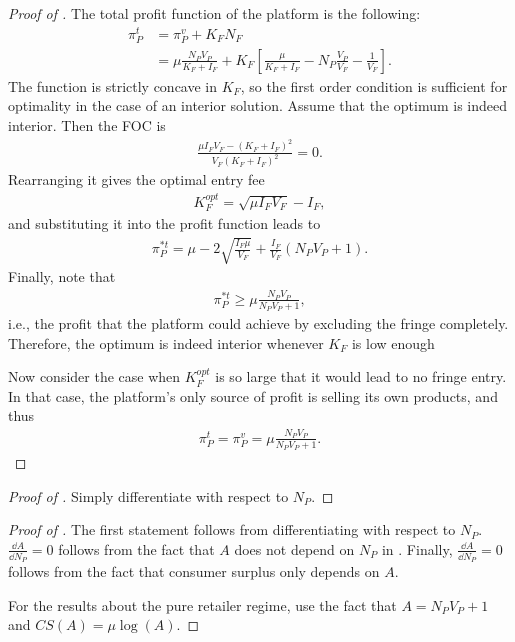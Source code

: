 \begin{proof}[Proof of ]
    The total profit function of the platform is the following:
    \begin{align}
        \pi_P^t &= \pi_P^v + K_F N_F \nonumber \\
        &= \mu \frac{N_P V_P}{K_F + I_F} + K_F \left[ \frac{\mu}{K_F + I_F} - N_P \frac{V_P}{V_F} - \frac{1}{V_F} \right]. \label{eq:platform_profits}
    \end{align}
    The function is strictly concave in $K_F$, so the first order condition is sufficient for optimality in the case of an interior solution.
    Assume that the optimum is indeed interior.
    Then the FOC is
    \begin{align*}
        \frac{\mu I_F V_F - (K_F + I_F)^2}{V_F (K_F + I_F)^2} = 0.
    \end{align*}
    Rearranging it gives the optimal entry fee
    \begin{align*}
        K_F^{opt} = \sqrt{\mu I_F V_F} - I_F,
    \end{align*}
    and substituting it into the profit function leads to
    \begin{align*}
        \pi_P^{*t} = \mu - 2\sqrt{\frac{I_F \mu}{V_F}} + \frac{I_F}{V_F} (N_P V_P + 1).
    \end{align*}
    Finally, note that
    \begin{align*}
        \pi_P^{*t} \geq \mu \frac{N_P V_P}{N_P V_P + 1},
    \end{align*}
    i.e., the profit that the platform could achieve by excluding the fringe completely.
    Therefore, the optimum is indeed interior whenever $K_F$ is low enough

    Now consider the case when $K_F^{opt}$ is so large that it would lead to no fringe entry.
    In that case, the platform's only source of profit is selling its own products, and thus
    \begin{align*}
        \pi_P^{t} = \pi_P^{v} = \mu \frac{ N_P V_P}{N_P V_P + 1}.
    \end{align*}
\end{proof}

\begin{proof}[Proof of ]
    Simply differentiate  with respect to $N_P$.
\end{proof}

\begin{proof}[Proof of ]
    The first statement follows from differentiating  with respect to $N_P$.
    $\frac{\dd A}{\dd N_P} = 0$ follows from the fact that $A$ does not depend on $N_P$ in .
    Finally, $\frac{\dd A}{\dd N_P} = 0$ follows from the fact that consumer surplus only depends on $A$.
    
    For the results about the pure retailer regime, use the fact that $A = N_P V_P + 1$ and $CS(A) = \mu\log(A)$.
\end{proof}


